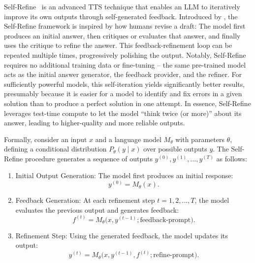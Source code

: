 Self-Refine~\citep{madaan2023selfrefine} is an advanced TTS technique that enables an LLM to iteratively improve its own outputs through self-generated feedback. Introduced by \citet{madaan2023selfrefine}, the Self-Refine framework is inspired by how humans revise a draft: The model first produces an initial answer, then critiques or evaluates that answer, and finally uses the critique to refine the answer. This feedback-refinement loop can be repeated multiple times, progressively polishing the output. Notably, Self-Refine requires no additional training data or fine-tuning – the same pre-trained model acts as the initial answer generator, the feedback provider, and the refiner.
For sufficiently powerful models, this self-iteration yields significantly better results, presumably because it is easier for a model to identify and fix errors in a given solution than to produce a perfect solution in one attempt. In essence, Self-Refine leverages test-time compute to let the model ``think twice (or more)'' about its answer, leading to higher-quality and more reliable outputs.

Formally, consider an input $x$ and a language model $M_\theta$ with parameters $\theta$, defining a conditional distribution $P_\theta(y \mid x)$ over possible outputs $y$. The Self-Refine procedure generates a sequence of outputs $y^{(0)}, y^{(1)}, \dots, y^{(T)}$ as follows:

\begin{enumerate}
    \item Initial Output Generation: The model first produces an initial response:
    \begin{equation}
        y^{(0)} = M_\theta(x).
    \end{equation}
    
    \item Feedback Generation: At each refinement step $t = 1,2,\dots,T$, the model evaluates the previous output and generates feedback:
    \begin{equation}
        f^{(t)} = M_\theta\big(x, y^{(t-1)}; \text{feedback-prompt}\big).
    \end{equation}
    
    \item Refinement Step: Using the generated feedback, the model updates its output:
    \begin{equation}
        y^{(t)} = M_\theta\big(x, y^{(t-1)}, f^{(t)}; \text{refine-prompt}\big).
    \end{equation}
\end{enumerate}

